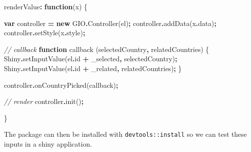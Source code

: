 \documentclass[
]{krantz}
\makeatletter
\newenvironment{Shaded}{\begin{snugshade}}{\end{snugshade}}
\newcommand{\AttributeTok}[1]{\textcolor[rgb]{0.61,0.61,0.61}{#1}}
\newcommand{\CommentTok}[1]{\textcolor[rgb]{0.37,0.37,0.37}{\textit{#1}}}
\newcommand{\FunctionTok}[1]{\textcolor[rgb]{0,0,0}{#1}}
\newcommand{\KeywordTok}[1]{\textcolor[rgb]{0.27,0.27,0.27}{\textbf{#1}}}
\newcommand{\NormalTok}[1]{#1}
\newcommand{\OperatorTok}[1]{\textcolor[rgb]{0.43,0.43,0.43}{\textbf{#1}}}
\newcommand{\StringTok}[1]{\textcolor[rgb]{0.5,0.5,0.5}{#1}}
\newenvironment{kframe}{%
\medskip{}
\setlength{\fboxsep}{.8em}
 \def\at@end@of@kframe{}%
 \ifinner\ifhmode%
  \def\at@end@of@kframe{\end{minipage}}%
  \begin{minipage}{\columnwidth}%
 \fi\fi%
 \def\FrameCommand##1{\hskip\@totalleftmargin \hskip-\fboxsep
 \colorbox{shadecolor}{##1}\hskip-\fboxsep
     \hskip-\linewidth \hskip-\@totalleftmargin \hskip\columnwidth}%
 \MakeFramed {\advance\hsize-\width
   \@totalleftmargin\z@ \linewidth\hsize
   \@setminipage}}%
 {\par\unskip\endMakeFramed%
 \at@end@of@kframe}
\renewenvironment{Shaded}{\begin{kframe}}{\end{kframe}}
\makeatother
\begin{document}
\begin{Shaded}
\begin{Highlighting}[]
\NormalTok{renderValue}\OperatorTok{:} \KeywordTok{function}\NormalTok{(x) \{}

  \KeywordTok{var}\NormalTok{ controller }\OperatorTok{=} \KeywordTok{new}\NormalTok{ GIO}\OperatorTok{.}\FunctionTok{Controller}\NormalTok{(el)}\OperatorTok{;}
\NormalTok{  controller}\OperatorTok{.}\FunctionTok{addData}\NormalTok{(x}\OperatorTok{.}\AttributeTok{data}\NormalTok{)}\OperatorTok{;}
\NormalTok{  controller}\OperatorTok{.}\FunctionTok{setStyle}\NormalTok{(x}\OperatorTok{.}\AttributeTok{style}\NormalTok{)}\OperatorTok{;}

  \CommentTok{// callback}
  \KeywordTok{function}\NormalTok{ callback (selectedCountry}\OperatorTok{,}\NormalTok{ relatedCountries) \{}
\NormalTok{    Shiny}\OperatorTok{.}\FunctionTok{setInputValue}\NormalTok{(el}\OperatorTok{.}\AttributeTok{id} \OperatorTok{+} \StringTok{\textquotesingle{}\_selected\textquotesingle{}}\OperatorTok{,}\NormalTok{ selectedCountry)}\OperatorTok{;}
\NormalTok{    Shiny}\OperatorTok{.}\FunctionTok{setInputValue}\NormalTok{(el}\OperatorTok{.}\AttributeTok{id} \OperatorTok{+} \StringTok{\textquotesingle{}\_related\textquotesingle{}}\OperatorTok{,}\NormalTok{ relatedCountries)}\OperatorTok{;}
\NormalTok{  \}}

\NormalTok{  controller}\OperatorTok{.}\FunctionTok{onCountryPicked}\NormalTok{(callback)}\OperatorTok{;}

  \CommentTok{// render}
\NormalTok{  controller}\OperatorTok{.}\FunctionTok{init}\NormalTok{()}\OperatorTok{;}

\NormalTok{\}}
\end{Highlighting}
\end{Shaded}

The package can then be installed with \texttt{devtools::install} so we can test these inputs in a shiny application.
\end{document}
